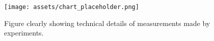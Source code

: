 



\begin{figure}[h]
    \centering
    \begin{minipage}{0.3\linewidth}
        \centering
        \texttt{[image: assets/chart\_placeholder.png]}
    \end{minipage}
    \caption{Figure clearly showing technical details of measurements made by experiments.}
    \label{fig:system}
    \end{figure}








